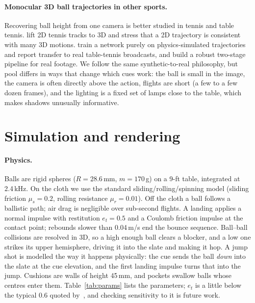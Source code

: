 \documentclass[11pt]{article}
\begin{document}
\paragraph{Monocular 3D ball trajectories in other sports.}
Recovering ball height from one camera is better studied in tennis and table tennis.
\citet{ponglertnapakorn2025where} lift 2D tennis tracks to 3D and stress that
a 2D trajectory is consistent with many 3D motions. \citet{kienzle2025spin}
train a network purely on physics-simulated trajectories and report transfer to
real table-tennis broadcasts, and \citet{kienzle2026uplifting} build a robust
two-stage pipeline for real footage. We follow the same synthetic-to-real
philosophy, but pool differs in ways that change which cues work: the ball is
small in the image, the camera is often directly above the action, flights are
short (a few to a few dozen frames), and the lighting is a fixed set of lamps
close to the table, which makes shadows unusually informative.

\section{Simulation and rendering}\label{sec:sim}

\paragraph{Physics.}
Balls are rigid spheres ($R=28.6$\,mm, $m=170$\,g) on a 9-ft table, integrated
at 2.4\,kHz. On the cloth we use the standard sliding/rolling/spinning model
(sliding friction $\mu_s=0.2$, rolling resistance $\mu_r=0.01$). Off the
cloth a ball follows a ballistic path; air drag is negligible over sub-second
flights. A landing applies a normal impulse with restitution $e_t=0.5$ and a
Coulomb friction impulse at the contact point; rebounds slower than
0.04\,m/s end the bounce sequence. Ball--ball collisions are resolved in 3D,
so a high enough ball clears a blocker, and a low one strikes its upper hemisphere,
driving it into the slate and making it hop. A jump shot is modelled the way it
happens physically: the cue sends the ball \emph{down} into the slate at the
cue elevation, and the first landing impulse turns that into the jump.
Cushions are walls of height 45\,mm, and pockets swallow balls whose centres
enter them. Table~\ref{tab:params} lists the parameters; $e_t$ is a little below
the typical 0.6 quoted by~\citet{alciatore_tpb10}, and checking sensitivity to it is
future work.
\end{document}
